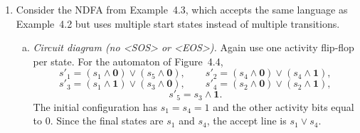 \begin{enumerate}[{4.}1.]
\begin{enumerate}[(a)]
  \item \emph{Circuit diagram (with \textless SOS\textgreater{} and
    \textless EOS\textgreater).}  Use one activity flip-flop for each
    state $s_0,\dots,s_5$.  The next-state equations are
    \[
    s'_0=\text{\<SOS\>},\qquad
    s'_1=(s_0\wedge \pmb{0})\vee(s_1\wedge \pmb{0})\vee(s_5\wedge \pmb{1}),
    \]
    \[
    s'_2=(s_0\wedge \pmb{0})\vee(s_0\wedge \pmb{1})\vee
         (s_4\wedge \pmb{0})\vee(s_4\wedge \pmb{1}),
    \]
    \[
    s'_3=(s_0\wedge \pmb{1})\vee(s_1\wedge \pmb{1})\vee(s_3\wedge \pmb{0}),
    \]
    \[
    s'_4=(s_2\wedge \pmb{0})\vee(s_2\wedge \pmb{1}),\qquad
    s'_5=(s_3\wedge \pmb{1})\vee(s_5\wedge \pmb{0}).
    \]
    Since the final states in Figure~4.3 are $s_0$, $s_1$, and $s_4$, the
    accept line is
    \[
      (s_0\vee s_1\vee s_4)\wedge \text{\<EOS\>}.
    \]

  \item \emph{DFA via subset construction.}  Starting from the set of
  start state $\{s_0\}$, the connected portion of the subset DFA has the
  following reachable states:
  \[
  Q_0=\{s_0\},\quad
  Q_1=\{s_1,s_2\},\quad
  Q_2=\{s_2,s_3\},\quad
  Q_3=\{s_1,s_4\},\quad
  Q_4=\{s_3,s_4\},
  \]
  \[
  Q_5=\{s_4,s_5\},\quad
  Q_6=\{s_2,s_5\}.
  \]
  Their transitions are
  \[
  \begin{array}{c|cc}
   & \pmb{0} & \pmb{1}\\\hline
  Q_0 & Q_1 & Q_2\\
  Q_1 & Q_3 & Q_4\\
  Q_2 & Q_4 & Q_5\\
  Q_3 & Q_1 & Q_2\\
  Q_4 & Q_2 & Q_6\\
  Q_5 & Q_6 & Q_3\\
  Q_6 & Q_5 & Q_3
  \end{array}
  \]
  The final states are exactly those subsets containing one of the original
  final states $s_0$, $s_1$, or $s_4$, namely
  \[
  Q_0,\ Q_1,\ Q_3,\ Q_4,\ Q_5.
  \]
\end{enumerate}

\item Consider the NDFA from Example~4.3, which accepts the same language as
Example~4.2 but uses multiple start states instead of multiple transitions.

\begin{enumerate}[(a)]
  \item \emph{Circuit diagram (no \textless SOS\textgreater{} or
    \textless EOS\textgreater).}  Again use one activity flip-flop per
    state.  For the automaton of Figure~4.4,
    \[
    s'_1=(s_1\wedge \pmb{0})\vee(s_5\wedge \pmb{0}),\qquad
    s'_2=(s_4\wedge \pmb{0})\vee(s_4\wedge \pmb{1}),
    \]
    \[
    s'_3=(s_1\wedge \pmb{1})\vee(s_3\wedge \pmb{0}),\qquad
    s'_4=(s_2\wedge \pmb{0})\vee(s_2\wedge \pmb{1}),
    \]
    \[
    s'_5=s_3\wedge \pmb{1}.
    \]
    The initial configuration has $s_1=s_4=1$ and the other activity bits
    equal to $0$.  Since the final states are $s_1$ and $s_4$, the accept
    line is $s_1\vee s_4$.


\end{enumerate}
\end{enumerate}
